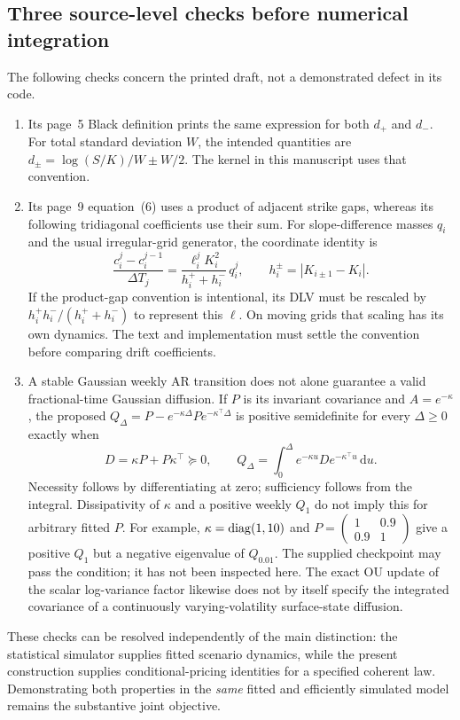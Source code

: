 \documentclass[11pt,a4paper]{article}
\numberwithin{equation}{section}
\theoremstyle{definition}\newtheorem{definition}[theorem]{Definition}
\theoremstyle{remark}\newtheorem{remark}[theorem]{Remark}
\newcommand{\dd}{\,\mathrm d}\newcommand{\dt}{\,\mathrm dt}
\begin{document}
\subsection{Three source-level checks before numerical integration}
The following checks concern the printed draft, not a demonstrated defect in its code.
\begin{enumerate}
\item Its page~5 Black definition prints the same expression for both $d_+$ and $d_-$. For total standard deviation $W$, the intended quantities are $d_\pm=\log(S/K)/W\pm W/2$. The kernel in this manuscript uses that convention.
\item Its page~9 equation~(6) uses a product of adjacent strike gaps, whereas its following tridiagonal coefficients use their sum. For slope-difference masses $q_i$ and the usual irregular-grid generator, the coordinate identity is
\[
 \frac{c_i^j-c_i^{j-1}}{\Delta T_j}
   =\frac{\ell_i^j K_i^2}{h_i^++h_i^-}\,q_i^j,
 \qquad h_i^\pm=|K_{i\pm1}-K_i|.
\]
If the product-gap convention is intentional, its DLV must be rescaled by $h_i^+h_i^-/(h_i^++h_i^-)$ to represent this $\ell$. On moving grids that scaling has its own dynamics. The text and implementation must settle the convention before comparing drift coefficients.
\item A stable Gaussian weekly AR transition does not alone guarantee a valid fractional-time Gaussian diffusion. If $P$ is its invariant covariance and $A=e^{-\kappa}$, the proposed $Q_\Delta=P-e^{-\kappa\Delta}Pe^{-\kappa^\top\Delta}$ is positive semidefinite for every $\Delta\geq0$ exactly when
\begin{equation}
 D=\kappa P+P\kappa^\top\succeq0,
 \qquad Q_\Delta=\int_0^\Delta e^{-\kappa u}D e^{-\kappa^\top u}\dd u.
 \label{eq:dy2-embedding}
\end{equation}
Necessity follows by differentiating at zero; sufficiency follows from the integral. Dissipativity of $\kappa$ and a positive weekly $Q_1$ do not imply this for arbitrary fitted $P$. For example, $\kappa=\operatorname{diag}(1,10)$ and $P=\left(\begin{smallmatrix}1&0.9\\0.9&1\end{smallmatrix}\right)$ give a positive $Q_1$ but a negative eigenvalue of $Q_{0.01}$. The supplied checkpoint may pass the condition; it has not been inspected here. The exact OU update of the scalar log-variance factor likewise does not by itself specify the integrated covariance of a continuously varying-volatility surface-state diffusion.
\end{enumerate}
These checks can be resolved independently of the main distinction: the statistical simulator supplies fitted scenario dynamics, while the present construction supplies conditional-pricing identities for a specified coherent law. Demonstrating both properties in the \emph{same} fitted and efficiently simulated model remains the substantive joint objective.
\end{document}
